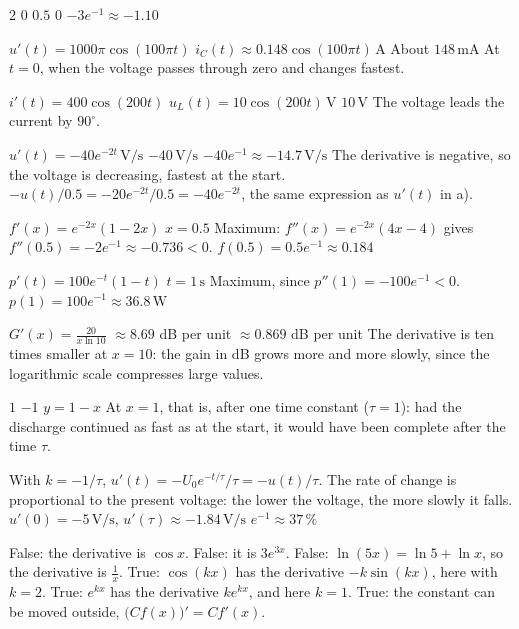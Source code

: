 \begin{facit}
  $2$  $0$  $0.5$  $0$  $-3e^{-1} \approx -1.10$

  $u'(t) = 1000\pi\cos(100\pi t)$
 $i_C(t) \approx 0.148\cos(100\pi t)\,\text{A}$  About $148\,\text{mA}$
 At $t = 0$, when the voltage passes through zero and changes fastest.

  $i'(t) = 400\cos(200t)$  $u_L(t) = 10\cos(200t)\,\text{V}$
 $10\,\text{V}$  The voltage leads the current by $90^{\circ}$.

  $u'(t) = -40e^{-2t}\,\text{V/s}$  $-40\,\text{V/s}$
 $-40e^{-1} \approx -14.7\,\text{V/s}$
 The derivative is negative, so the voltage is decreasing, fastest at the start.
 $-u(t)/0.5 = -20e^{-2t}/0.5 = -40e^{-2t}$, the same expression as $u'(t)$ in a).

  $f'(x) = e^{-2x}(1 - 2x)$  $x = 0.5$
 Maximum: $f''(x) = e^{-2x}(4x - 4)$ gives $f''(0.5) = -2e^{-1} \approx -0.736 < 0$.
 $f(0.5) = 0.5e^{-1} \approx 0.184$

  $p'(t) = 100e^{-t}(1 - t)$  $t = 1\,\text{s}$
 Maximum, since $p''(1) = -100e^{-1} < 0$.
 $p(1) = 100e^{-1} \approx 36.8\,\text{W}$

  $G'(x) = \frac{20}{x \ln 10}$  $\approx 8.69$ dB per unit
 $\approx 0.869$ dB per unit
 The derivative is ten times smaller at $x = 10$: the gain in dB grows more and more slowly,
since the logarithmic scale compresses large values.

  $1$  $-1$  $y = 1 - x$
 At $x = 1$, that is, after one time constant ($\tau = 1$): had the discharge continued as
fast as at the start, it would have been complete after the time $\tau$.

  With $k = -1/\tau$, $u'(t) = -U_0e^{-t/\tau}/\tau = -u(t)/\tau$.
 The rate of change is proportional to the present voltage: the lower the voltage, the more
slowly it falls.
 $u'(0) = -5\,\text{V/s}$, $u'(\tau) \approx -1.84\,\text{V/s}$
 $e^{-1} \approx 37\,\%$

  False: the derivative is $\cos x$.  False: it is $3e^{3x}$.
 False: $\ln(5x) = \ln 5 + \ln x$, so the derivative is $\frac{1}{x}$.
 True: $\cos(kx)$ has the derivative $-k\sin(kx)$, here with $k = 2$.
 True: $e^{kx}$ has the derivative $ke^{kx}$, and here $k = 1$.
 True: the constant can be moved outside, $\bigl(Cf(x)\bigr)' = Cf'(x)$.


\end{facit}
